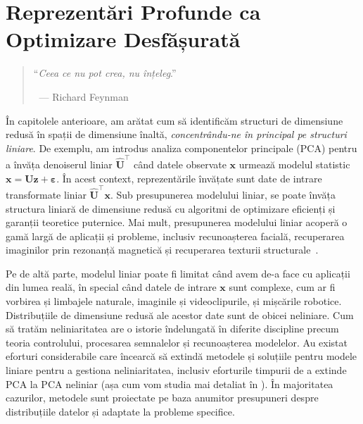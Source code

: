 \documentclass[../../book-main_ro.tex]{subfiles}
\begin{document}
\chapter{Reprezentări Profunde ca Optimizare Desfășurată}
\label{ch:representation}
\label{ch:unrolling}

\begin{quote}
\hfill    ``{\em Ceea ce nu pot crea, nu înțeleg}.''

$~$ \hfill --- Richard Feynman   
\end{quote}
\vspace{5mm}




În capitolele anterioare, am arătat cum să identificăm structuri de dimensiune redusă în spații de dimensiune înaltă, \textit{concentrându-ne în principal pe structuri liniare}. 
De exemplu, am introdus analiza componentelor principale (PCA) pentru a învăța denoiserul liniar $\hat{\bm{U}}^{\top}$ când datele observate $\bm{x}$ urmează modelul statistic $\bm{x} = \bm{U}\bm{z} + \bm{\varepsilon}$. 
În acest context, reprezentările învățate sunt date de intrare transformate liniar $\hat{\bm{U}}^{\top}\bm{x}$.
Sub presupunerea modelului liniar, se poate învăța structura liniară de dimensiune redusă cu algoritmi de optimizare eficienți și garanții teoretice puternice. 
Mai mult, presupunerea modelului liniar acoperă o gamă largă de aplicații și probleme, inclusiv recunoașterea facială, recuperarea imaginilor prin rezonanță magnetică și recuperarea texturii structurale~\cite{Wright-Ma-2022}.

Pe de altă parte, modelul liniar poate fi limitat când avem de-a face cu aplicații din lumea reală, în special când datele de intrare $\bm{x}$ sunt complexe, cum ar fi vorbirea și limbajele naturale, imaginile și videoclipurile, și mișcările robotice. Distribuțiile de dimensiune redusă ale acestor date sunt de obicei neliniare. 
Cum să tratăm neliniaritatea are o istorie îndelungată în diferite discipline precum teoria controlului, procesarea semnalelor și recunoașterea modelelor.  Au existat eforturi considerabile care încearcă să extindă metodele și soluțiile pentru modele liniare pentru a gestiona neliniaritatea, inclusiv eforturile timpurii de a extinde PCA la PCA neliniar (așa cum vom studia mai detaliat în ).  În majoritatea cazurilor, metodele sunt proiectate pe baza anumitor presupuneri despre distribuțiile datelor și adaptate la probleme specifice. 
\end{document}
